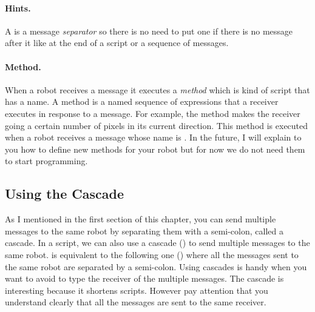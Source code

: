 
\paragraph{Hints.} A \period {} is a  message \textit{separator} so there is no need to put one if there is no message after it like at the end of a script or a sequence of messages.


\paragraph{Method.}
When  a robot receives a message it executes a \emph{method} which is kind of script that has a name.  A method is a named sequence of expressions that a receiver executes in response to a message. For example, the method \go makes the receiver going a certain number of pixels in its current direction. This method \go is executed when a robot receives a message whose name is \go. In the future, I will explain to you how to define new methods for your robot but for now we do not need them to start programming.



\subsection{Using the Cascade}
As I mentioned in the first section of this chapter, you can send multiple messages to the same robot by separating them with a semi-colon, called a cascade. 
In a script, we can also use a cascade (\ct{;}) to send multiple messages to the same robot.  is equivalent to the following one () where all the messages sent to the same robot are separated by a semi-colon. Using cascades is handy  when you want to avoid to type the receiver of the multiple messages. The cascade is interesting because it shortens scripts. However pay attention that you understand clearly that all the messages are sent to the same receiver.

